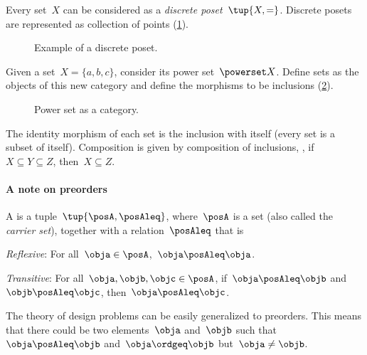 \begin{example}
  \label{ex:discreteposet}
  Every set~$X$ can be considered as a \emph{discrete poset}~$\tup{X,=}$. Discrete posets are represented as collection of points (\cref{fig:discretepos}).

  \begin{figure}[tbh]
    \centering
    \caption{Example of a discrete poset. \label{fig:discretepos}}
  \end{figure}

  \begin{example}
    \label{ex:hasseinclusion}
    Given a set~$X=\{a,b,c\}$, consider its power set~$\powerset X$. Define sets as the objects of this new category and define the morphisms to be inclusions (\cref{fig:powersetcat}).

    \begin{figure}[h!]
      \begin{center}
      \end{center}
      \caption{Power set as a category.}
      \label{fig:powersetcat}
    \end{figure}

    The identity morphism of each set is the inclusion with itself (every set is a subset of itself). Composition is given by composition of inclusions, \ie , if~$X\subseteq Y \subseteq Z$, then~$X\subseteq Z$.
  \end{example}
\end{example}

\paragraph{A note on preorders}
\begin{definition}[Preorder]
  \label{def:preorder}
  A \emph{} is a tuple~$\tup{\posA, \posAleq}$,
  where~$\posA$ is a set (also called the \emph{carrier set}), together with a
  relation~$\posAleq$  that is
  \begin{compactenum}
    \item \emph{Reflexive}: For all~$\obja\in \posA$,~$\obja\posAleq \obja$.
    \item \emph{Transitive}: For all~$\obja,\objb,\objc\in \posA$, if~$\obja\posAleq \objb$ and~$\objb\posAleq \objc$, then~$\obja\posAleq \objc$.
  \end{compactenum}
\end{definition}
The theory of design problems can be easily generalized to preorders. This means that there could be two elements~$\obja$ and~$\objb$ such that~$\obja\posAleq \objb$ and~$\obja \ordgeq \objb$ but~$\obja \neq \objb$.


